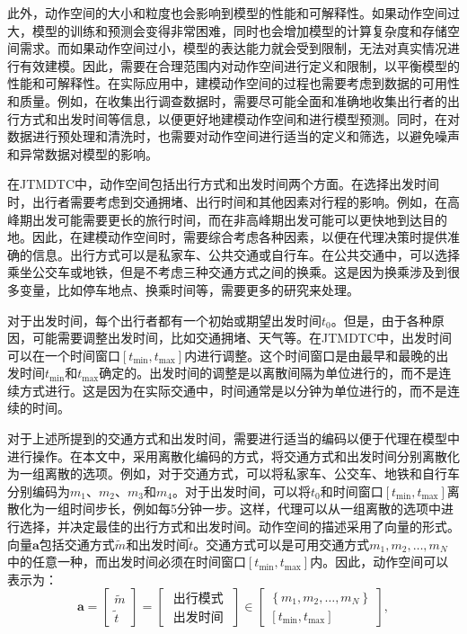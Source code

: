 此外，动作空间的大小和粒度也会影响到模型的性能和可解释性。如果动作空间过大，模型的训练和预测会变得非常困难，同时也会增加模型的计算复杂度和存储空间需求。而如果动作空间过小，模型的表达能力就会受到限制，无法对真实情况进行有效建模。因此，需要在合理范围内对动作空间进行定义和限制，以平衡模型的性能和可解释性。在实际应用中，建模动作空间的过程也需要考虑到数据的可用性和质量。例如，在收集出行调查数据时，需要尽可能全面和准确地收集出行者的出行方式和出发时间等信息，以便更好地建模动作空间和进行模型预测。同时，在对数据进行预处理和清洗时，也需要对动作空间进行适当的定义和筛选，以避免噪声和异常数据对模型的影响。

在JTMDTC中，动作空间包括出行方式和出发时间两个方面。在选择出发时间时，出行者需要考虑到交通拥堵、出行时间和其他因素对行程的影响。例如，在高峰期出发可能需要更长的旅行时间，而在非高峰期出发可能可以更快地到达目的地。因此，在建模动作空间时，需要综合考虑各种因素，以便在代理决策时提供准确的信息。出行方式可以是私家车、公共交通或自行车。在公共交通中，可以选择乘坐公交车或地铁，但是不考虑三种交通方式之间的换乘。这是因为换乘涉及到很多变量，比如停车地点、换乘时间等，需要更多的研究来处理。

对于出发时间，每个出行者都有一个初始或期望出发时间$t_0$。但是，由于各种原因，可能需要调整出发时间，比如交通拥堵、天气等。在JTMDTC中，出发时间可以在一个时间窗口$[t_{\min},t_{\max}]$内进行调整。这个时间窗口是由最早和最晚的出发时间$t_{\min}$和$t_{\max}$确定的。出发时间的调整是以离散间隔为单位进行的，而不是连续方式进行。这是因为在实际交通中，时间通常是以分钟为单位进行的，而不是连续的时间。

对于上述所提到的交通方式和出发时间，需要进行适当的编码以便于代理在模型中进行操作。在本文中，采用离散化编码的方式，将交通方式和出发时间分别离散化为一组离散的选项。例如，对于交通方式，可以将私家车、公交车、地铁和自行车分别编码为$m_1$、$m_2$、$m_3$和$m_4$。对于出发时间，可以将$t_0$和时间窗口$[t_{\min},t_{\max}]$离散化为一组时间步长，例如每5分钟一步。这样，代理可以从一组离散的选项中进行选择，并决定最佳的出行方式和出发时间。动作空间的描述采用了向量的形式。向量$\bm{a}$包括交通方式$\tilde{m}$和出发时间$\tilde{t}$。交通方式可以是可用交通方式$m_{1},m_{2}, \ldots, m_{N}$中的任意一种，而出发时间必须在时间窗口$[t_{\min }, t_{\max }]$内。因此，动作空间可以表示为：
\begin{equation}
\bm{a}=\left[\begin{array}{c}
\tilde{m} \\
\tilde{t}
\end{array}\right]=\left[\begin{array}{c}
\text { 出行模式 } \\
\text { 出发时间 }
\end{array}\right]
\in\left[\begin{array}{c}
\left\{m_{1},m_{2}, \ldots, m_{N}\right\} \\
{\left[t_{\min }, t_{\max }\right]}
\end{array}\right],
\end{equation}


